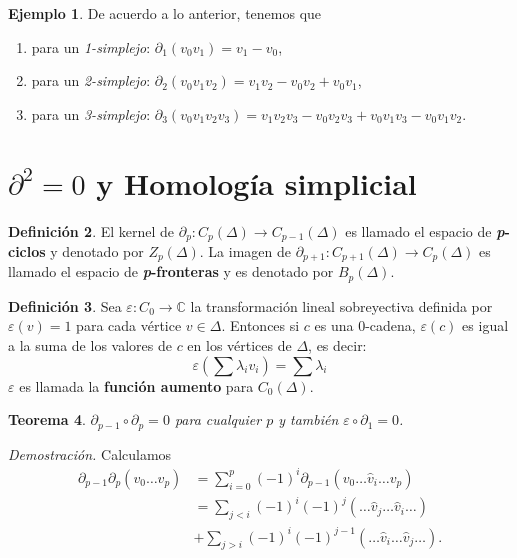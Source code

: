 \documentclass[12pt]{book}
\newtheorem{theorem}{Teorema}[section]
\theoremstyle{definition}
\newtheorem{definition}[theorem]{Definición}
\newtheorem{example}[theorem]{Ejemplo}
\newcounter{in}
\newcounter{ini}
\begin{document}
\begin{example}
  De acuerdo a lo anterior, tenemos que
  \begin{enumerate}
  \item para un \emph{1-simplejo}: $\partial_{1}(v_{0}v_{1})= v_{1}-v_{0}$,
  \item para un \emph{2-simplejo}: $\partial_{2}(v_{0}v_{1}v_{2})=v_{1}v_{2}-v_{0}v_{2}+v_{0}v_{1}$,
  \item para un \emph{3-simplejo}:
    $\partial_{3}(v_{0}v_{1}v_{2}v_{3})=v_{1}v_{2}v_{3}-v_{0}v_{2}v_{3}+v_{0}v_{1}v_{3}-v_{0}v_{1}v_{2}$. 
  \end{enumerate}
\end{example}

\section{$\partial^{2}=0$ y Homología simplicial}

\begin{definition}
   El kernel de $\partial_{p}:C_{p}(\Delta)\rightarrow
   C_{p-1}(\Delta)$ es llamado el espacio de
   \textbf{\emph{p}-ciclos} y denotado por $Z_{p}(\Delta)$. La imagen
   de $\partial_{p+1}:C_{p+1}(\Delta)\rightarrow C_{p}(\Delta)$ es
   llamado el espacio de \textbf{\emph{p}-fronteras} y es denotado por $B_{p}(\Delta)$.
\end{definition}

\begin{definition}
  Sea $\varepsilon:C_{0}\rightarrow \mathbb{C}$ la transformación
  lineal sobreyectiva definida por $\varepsilon(v)=1$ para cada
  vértice $v\in \Delta$. Entonces si $c$ es una $0$-cadena,
  $\varepsilon(c)$ es igual a la suma de los valores de $c$ en los
  vértices de $\Delta$, es decir:
  $$\varepsilon(\sum \lambda_{i}v_{i})=\sum\lambda_{i}$$
  $\varepsilon$ es llamada la \textbf{función aumento} para
  $C_{0}(\Delta)$.
\end{definition}

\begin{theorem}
  $\partial_{p-1}\circ\partial_{p}=0$ para cualquier $p$ y también $\varepsilon\circ\partial_{1}=0$.
\end{theorem}

\textit{Demostración.} Calculamos 
\begin{align*}
  \partial_{p-1}\partial_{p}(v_{0}\ldots
  v_{p})&=\sum_{i=0}^{p}(-1)^{i}\partial_{p-1}(v_{0}\ldots \widehat v_{i}\ldots v_{p})\\
  &=\sum_{j<i}(-1)^{i}(-1)^{j}(\ldots \widehat v_{j} \ldots \widehat v_{i} \ldots)\\
  &+\sum_{j>i}(-1)^{i}(-1)^{j-1}(\ldots\widehat v_{i}\ldots \widehat v_{j}\ldots).
\end{align*}
\end{document}
